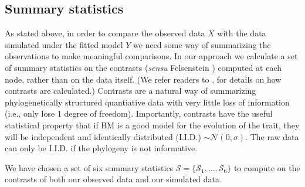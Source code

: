 \documentclass[a4paper,12pt]{article}
\begin{document}
\subsection{Summary statistics}
As stated above, in order to compare the observed data $X$ with the data simulated under the fitted model $Y$ we need some way of summarizing the observations to make meaningful comparisons. 
In our approach we calculate a set of summary statistics on the contrasts (\textit{sensu} Felsenstein \citep{Felsenstein1985}) computed at each node, rather than on the data itself. (We refer readers to \citep{Felsenstein1985, Rohlf2001, Blomberg2012}, for details on how contrasts are calculated.) Contrasts are a natural way of summarizing phylogenetically structured quantiative data with very little loss of information (i.e., only lose 1 degree of freedom). Importantly, contrasts have the useful statistical property that if BM is a good model for the evolution of the trait, they will be independent and identically distributed (I.I.D.) $\sim \mathcal{N}(0, \sigma)$. The raw data can only be I.I.D. if the phylogeny is not informative. 

We have chosen a set of six summary statistics $\mathcal{S} = \lbrace \mathcal{S}_1, \ldots, \mathcal{S}_6 \rbrace$ to compute on the contrasts of both our observed data and our simulated data.
\end{document}
